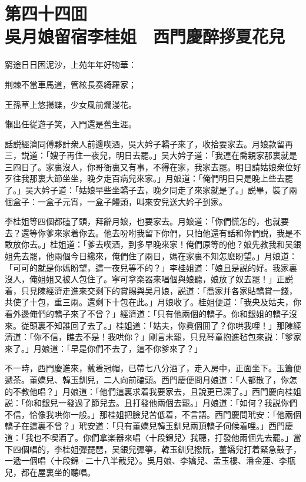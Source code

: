 
\chapter*{第四十四囬　\\吳月娘留宿李桂姐　西門慶醉拶夏花兒}
\thispagestyle{empty}

\begin{myquote}
窮途日日困泥沙，上苑年年好物華：

荆棘不當車馬道，管絃長奏綺羅家；

王孫草上悠揚蝶，少女風前爛漫花。

懶出任従遊子笑，入門還是舊生涯。
\end{myquote}

話説經濟同傅夥計衆人前邊喫酒，吳大妗子轎子來了，收拾要家去。月娘款留再三，説道：「嫂子再住一夜兒，明日去罷。」吴大妗子道：「我連在喬親家那裏就是三四日了。家裏沒人，你哥衙裏又有事，不得在家，我家去罷。明日請姑娘衆位好歹往我那裏大節坐坐，晚夕走百病兒來家。」月娘道：「俺們明日只是晚上些去罷了。」吴大妗子道：「姑娘早些坐轎子去，晚夕同走了來家就是了。」説畢，裝了兩個盒子：一盒子元宵，一盒子饅頭，叫來安兒送大妗子到家。

李桂姐等四個都磕了頭，拜辭月娘，也要家去。月娘道：「你們慌怎的，也就要去？還等你爹來家着你去。他去吩咐我留下你們，只怕他還有話和你們説，我是不敢放你去。」桂姐道：「爹去喫酒，到多早晚來家！俺們原等的他？娘先教我和吴銀姐先去罷，他兩個今日纔來，俺們住了兩日，媽在家裏不知怎麽盼望。」月娘道：「可可的就是你媽盼望，這一夜兒等不的？」李桂姐道：「娘且是説的好。我家裏沒人，俺姐姐又被人包住了。寜可拿楽器來唱個與娘聽，娘放了奴去罷！」正説着，只見陳經濟走進來交剩下的賞賜與吴月娘，説道：「喬家并各家貼轎賞一錢，共使了十包，重三兩。還剩下十包在此。」月娘收了。桂姐便道：「我央及姑夫，你看外邊俺們的轎子來了不曾？」經濟道：「只有他兩個的轎子。你和銀姐的轎子沒來。従頭裏不知誰回了去了。」桂姐道：「姑夫，你眞個囬了？你哄我哩！」那陳經濟道：「你不信，瞧去不是！我哄你？」剛言未罷，只見琴童抱進毡包來説：「爹家來了。」月娘道：「早是你們不去了，這不你爹來了？」

不一時，西門慶進來，戴着冠帽，已帶七八分酒了，走入房中，正面坐下。玉簫便遞茶。董嬌兒、韓玉釧兒，二人向前磕頭。西門慶便問月娘道：「人都散了，你怎的不教他唱？」月娘道：「他們這裏求着我要家去，且說更已深了。」西門慶向桂姐説：「你和銀兒一發過了節兒去。且打發他兩個去罷。」月娘道：「如何？我説你們不信，恰像我哄你一般。」那桂姐把臉兒苦低着，不言語。西門慶問玳安：「他兩個轎子在這裏不曾？」玳安道：「只有董嬌兒韓玉釧兒兩頂轎子伺候着哩。」西門慶道：「我也不喫酒了。你們拿楽器來唱〈十段錦兒〉我聽，打發他兩個先去罷。」當下四個唱的，李桂姐彈琵琶，吴銀兒彈箏，韓玉釧兒撥阮，董嬌兒打着緊急鼓子，一遞一個唱〈十段錦·二十八半截兒〉。吳月娘、李嬌兒、孟玉樓、潘金蓮、李瓶兒，都在屋裏坐的聽唱。

